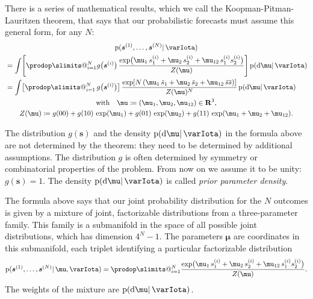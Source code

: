 \documentclass[\ifafour a4paper,12pt,\else a5paper,10pt,\fi%
onecolumn,oneside,article,%
british%
]{memoir}
\makeatletter
\theoremstyle{remark}
\theoremstyle{innote}
\def\prod{\DOTSI\prodop\slimits@}
\newcommand*{\di}{\mathrm{d}}%
\newcommand*{\RR}{\bm{\mathrm{R}}}
\newcommand*{\defd}{\coloneqq}
\newcommand*{\pf}{\mathrm{p}}%
\renewcommand*{\|}{\mathpunct{|}}
\newcommand*{\tprod}{\mathop{\textstyle\prod}\nolimits}
\newcommand*{\widebar}[1]{{\mkern1.5mu\skew{2}\overline{\mkern-1.5mu#1\mkern-1.5mu}\mkern 1.5mu}}
\newcommand*{\yI}{\varIota}
\newcommand*{\ys}{\bm{s}}
\newcommand*{\yso}[1]{\ys^{(#1)}}
\newcommand*{\ysso}[1]{s^{(#1)}}
\newcommand*{\la}{\mu_{12}}
\newcommand*{\yth}{\bm{\mu}}
\newcommand*{\yavv}{\widebar{s}}
\newcommand*{\ycv}{\widebar{ss}}
\makeatother
\begin{document}
There is a series of mathematical results, which we call the
Koopman-Pitman-Lauritzen theorem, that says that our probabilistic
forecasts must assume this general form, for any $N$:
\begin{multline}
  \label{eq:predictive_KP}
    \pf(\yso{1}, \dotsc, \yso{N} \|\yI )
\\  
\begin{aligned}
  &=\int
\Biggl[  \prod_{i=1}^{N}
  g\bigl(\yso{i}\bigr)\,
  \frac{  \exp\bigl(
    \mu_1\, \ysso{i}_1 + \mu_2\, \ysso{i}_2 + \la\, \ysso{i}_1 \ysso{i}_2
    \bigr) }{Z(\yth)}
  \Biggr]\,
  \pf(\di\yth \| \yI)
\\
  &=\int
  \bigl[\tprod_{i=1}^{N}g\bigl(\yso{i}\bigr) \bigr]\,
  \frac{  \exp[N \, (
    \mu_1\, \yavv_1 + \mu_2\, \yavv_2 + \la\, \ycv)]}{Z(\yth)^N}
\,  \pf(\di\yth \| \yI)
\end{aligned}
\\
\text{with}\quad
\yth\defd (\mu_1,\mu_2,\la) \in \RR^3,\\
  Z(\yth) \defd
  g(00)+ g(10)\,\exp(\mu_1) + g(01)\,\exp(\mu_2) + g(11)\,\exp(\mu_1+\mu_2+\la).
\end{multline}

The distribution $g(\ys)$ and the density $\pf(\di\yth \| \yI)$ in
the formula above are not determined by the theorem: they need to be
determined by additional assumptions. The distribution $g$ is often
determined by symmetry or combinatorial properties of the problem.
From now on we assume it to be unity: $g(\ys)=1$. The density
$\pf(\di\yth \|\yI)$ is called \emph{prior parameter density}.

The formula above says that our joint probability distribution for the $N$
outcomes is given by a mixture of joint, factorizable distributions from a
three-parameter family. This family is a submanifold in the space of all
possible joint distributions, which has dimension $4^N-1$. The parameters
$\yth$ are coordinates in this submanifold, each triplet identifying a
particular factorizable distribution
\begin{equation}
  \label{eq:extreme_distributions}
    \pf(\yso{1}, \dotsc, \yso{N} \|\yth, \yI ) =
  \prod_{i=1}^{N}
  \frac{  \exp\bigl(
    \mu_1\, \ysso{i}_1 + \mu_2\, \ysso{i}_2 + \la\, \ysso{i}_1 \ysso{i}_2
    \bigr) }{Z(\yth)}.
\end{equation}
The weights of the mixture are $\pf(\di\yth \|\yI)$.
\end{document}
